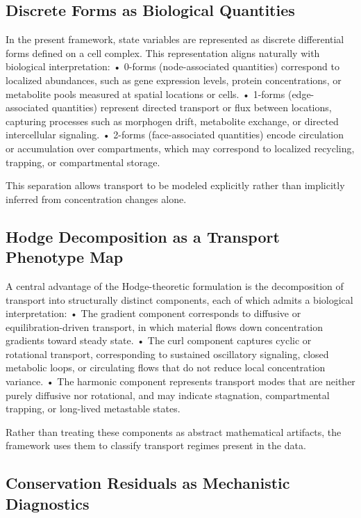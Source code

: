 \documentclass[10pt,article]{article}
\begin{document}
\subsection{Discrete Forms as Biological Quantities}

In the present framework, state variables are represented as discrete differential forms defined on a cell complex. This representation aligns naturally with biological interpretation:
	•	0-forms (node-associated quantities) correspond to localized abundances, such as gene expression levels, protein concentrations, or metabolite pools measured at spatial locations or cells.
	•	1-forms (edge-associated quantities) represent directed transport or flux between locations, capturing processes such as morphogen drift, metabolite exchange, or directed intercellular signaling.
	•	2-forms (face-associated quantities) encode circulation or accumulation over compartments, which may correspond to localized recycling, trapping, or compartmental storage.

This separation allows transport to be modeled explicitly rather than implicitly inferred from concentration changes alone.

\subsection{Hodge Decomposition as a Transport Phenotype Map}

A central advantage of the Hodge-theoretic formulation is the decomposition of transport into structurally distinct components, each of which admits a biological interpretation:
	•	The gradient component corresponds to diffusive or equilibration-driven transport, in which material flows down concentration gradients toward steady state.
	•	The curl component captures cyclic or rotational transport, corresponding to sustained oscillatory signaling, closed metabolic loops, or circulating flows that do not reduce local concentration variance.
	•	The harmonic component represents transport modes that are neither purely diffusive nor rotational, and may indicate stagnation, compartmental trapping, or long-lived metastable states.

Rather than treating these components as abstract mathematical artifacts, the framework uses them to classify transport regimes present in the data.

\subsection{Conservation Residuals as Mechanistic Diagnostics}
\end{document}
